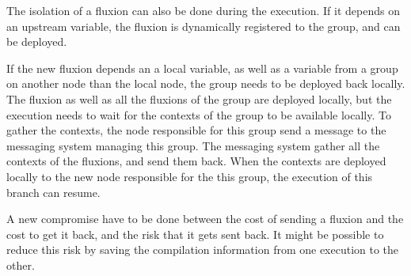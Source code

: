 The isolation of a fluxion can also be done during the execution.
If it depends on an upstream variable, the fluxion is dynamically registered to the group, and can be deployed.

If the new fluxion depends an a local variable, as well as a variable from a group on another node than the local node, the group needs to be deployed back locally.
The fluxion as well as all the fluxions of the group are deployed locally, but the execution needs to wait for the contexts of the group to be available locally.
To gather the contexts, the node responsible for this group send a message to the messaging system managing this group.
The messaging system gather all the contexts of the fluxions, and send them back.
When the contexts are deployed locally to the new node responsible for the this group, the execution of this branch can resume.

A new compromise have to be done between the cost of sending a fluxion and the cost to get it back, and the risk that it gets sent back.
It might be possible to reduce this risk by saving the compilation information from one execution to the other.
